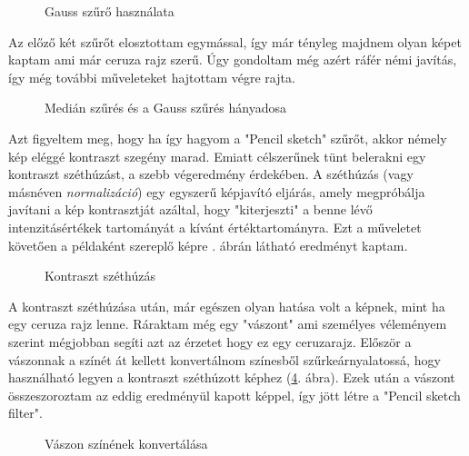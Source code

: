 \begin{figure}[h!]
\centering
{}
\caption{Gauss szűrő használata } 
\label{fig:pencil3}
\end{figure}



Az előző két szűrőt elosztottam egymással, így már tényleg majdnem olyan képet kaptam ami már ceruza rajz szerű. Úgy gondoltam még azért ráfér némi javítás, így még további műveleteket hajtottam végre rajta.

\begin{figure}[h!] 
\centering
{}
\caption{Medián szűrés és a Gauss szűrés hányadosa } 
\label{fig: pencil4}
\end{figure}


Azt figyeltem meg, hogy ha így hagyom a "Pencil sketch" szűrőt, akkor némely kép eléggé kontraszt szegény marad. Emiatt célszerűnek tünt belerakni egy kontraszt széthúzást, a szebb végeredmény érdekében. A széthúzás (vagy másnéven \textit{normalizáció}) egy egyszerű képjavító eljárás, amely megpróbálja javítani a kép kontrasztját azáltal, hogy "kiterjeszti" a benne lévő intenzitásértékek tartományát a kívánt értéktartományra. Ezt a műveletet követően a példaként szereplő képre . ábrán látható eredményt kaptam.

\begin{figure}[h!]
\centering
{}
\caption{Kontraszt széthúzás} 
\label{fig:pencil5}
\end{figure}


A kontraszt széthúzása után, már egészen olyan hatása volt a képnek, mint ha egy ceruza rajz lenne. Ráraktam még egy "vászont" ami személyes véleményem szerint mégjobban segíti azt az érzetet hogy ez egy ceruzarajz. Először a vászonnak a színét át kellett konvertálnom színesből szűrkeárnyalatossá, hogy használható legyen a kontraszt széthúzott képhez (\ref{fig:pencil6}. ábra). Ezek után a vászont összeszoroztam az eddig eredményül kapott képpel, így jött létre a "Pencil sketch filter".

\begin{figure}[h!] 
\centering
{}
\caption{Vászon színének konvertálása}
\label{fig:pencil6}
\end{figure}

